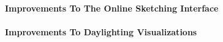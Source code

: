 \paragraph{Improvements To The Online Sketching Interface}


\paragraph{Improvements To Daylighting Visualizations}


